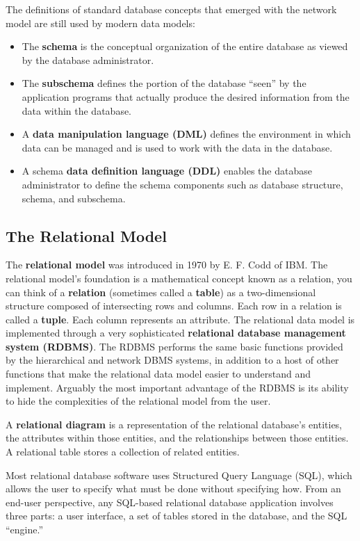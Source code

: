 \documentclass[a4paper, 12pt, titlepage]{report}
\begin{document}
The definitions of standard database concepts that emerged with the network model are still used by modern data models:
\begin{itemize}
\item The \textbf{schema} is the conceptual organization of the entire database as viewed by the database administrator.
\item The \textbf{subschema} defines the portion of the database “seen” by the application programs that actually produce the desired information from the data within the database.
\item A \textbf{data manipulation language (DML)} defines the environment in which data can be managed and is used to work with the data in the database.
\item A schema \textbf{data definition language (DDL)} enables the database administrator to define the schema components such as database
structure, schema, and subschema.
\end{itemize}
\subsection{The Relational Model}
The \textbf{relational model} was introduced in 1970 by E. F. Codd of IBM. The relational model’s foundation is a mathematical concept known as a relation, you can think of a \textbf{relation} (sometimes called a \textbf{table}) as a two-dimensional structure composed of intersecting rows and columns. Each row in a relation is called a \textbf{tuple}. Each column represents an attribute. The relational data model is implemented through a very sophisticated \textbf{relational database management system (RDBMS)}. The RDBMS performs the same basic functions provided by the hierarchical and network DBMS systems, in addition to a host of other functions that make the relational data model easier to understand and implement. Arguably the most important advantage of the RDBMS is its ability to hide the complexities of the relational model from the user.

A \textbf{relational diagram} is a representation of the relational database’s entities, the attributes within those entities, and the relationships between those entities. A relational table stores a collection of related entities.

Most relational database software uses Structured Query Language (SQL), which allows the user to specify what must be done without specifying how. From an end-user perspective, any SQL-based relational database application involves three parts: a user interface, a set of tables stored in the database, and the SQL “engine.”
\end{document}
